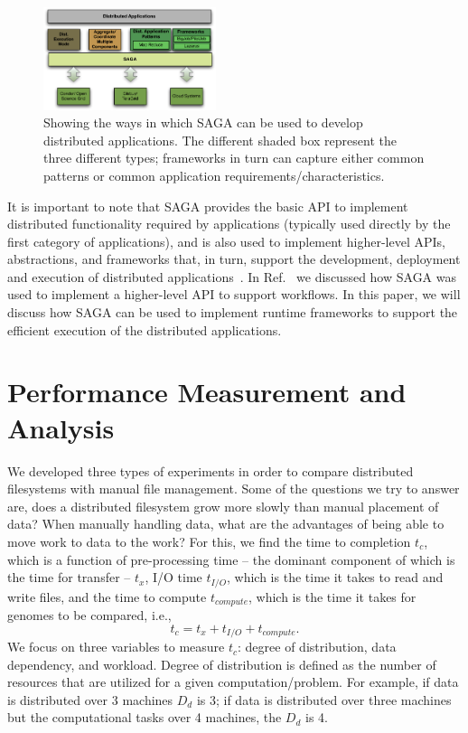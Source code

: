 \documentclass{rspublic}
\begin{document}
\begin{figure}[!ht]
  \begin{center}
    \includegraphics[width=0.45\textwidth]{distributed_applications_saga_figure.pdf}
  \end{center}
  \caption{\small Showing the ways in which SAGA can be used to
    develop distributed applications.  The different shaded box
    represent the three different types; frameworks in turn can
    capture either common patterns or common application
    requirements/characteristics. \label{Fig:sagaapps}}
\end{figure}

It is important to note that SAGA provides the basic API to implement
distributed functionality required by applications (typically used
directly by the first category of applications), and is also used to
implement higher-level APIs, abstractions, and frameworks that, in
turn, support the development, deployment and execution of distributed
applications~\cite{enkf-gmac09}. In Ref.~\cite{sagamontage09} we
discussed how SAGA was used to implement a higher-level API to support
workflows. In this paper, we will discuss how SAGA can be used to
implement runtime frameworks to support the efficient execution of the
distributed applications.


\section{Performance Measurement and Analysis} We developed three types
of experiments in order to compare distributed filesystems with manual
file management. Some of the questions we try to answer are, does a
distributed filesystem grow more slowly than manual placement of data?
When manually handling data, what are the advantages of being able to
move work to data to the work? For this, we find the time to completion
$t_c$, which is a function of pre-processing time -- the dominant
component of which is the time for transfer -- $t_x$, I/O time
$t_{I/O}$, which is the time it takes to read and write files, and the
time to compute $t_{compute}$, which is the time it takes for genomes to
be compared, i.e.,
 \begin{equation}
t_c = t_x + t_{I/O} + t_{compute}.
\end{equation}
We focus on three variables to measure $t_c$: degree of distribution,
data dependency, and workload. Degree of distribution is defined as
the number of resources that are utilized for a given
computation/problem. For example, if data is distributed over 3
machines $D_d$ is 3; if data is distributed over three machines but
the computational tasks over 4 machines, the $D_d$ is 4.
\end{document}
